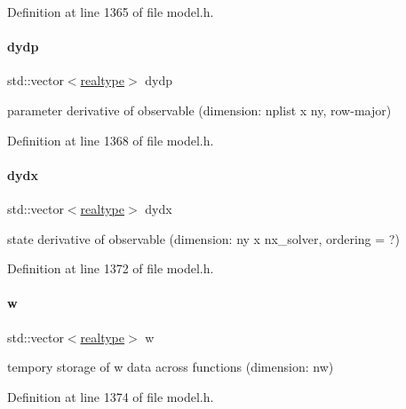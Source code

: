 Definition at line 1365 of file model.\+h.

\mbox{\label{classamici_1_1_model_a19a0e6ca8882314d7dd4e8f2fcc841fd}} 
\paragraph{\texorpdfstring{dydp}{dydp}}
{\footnotesize\ttfamily std\+::vector$<$\mbox{\hyperlink{namespaceamici_a1bdce28051d6a53868f7ccbf5f2c14a3}{realtype}}$>$ dydp\hspace{0.3cm}{\ttfamily [protected]}}

parameter derivative of observable (dimension\+: nplist x ny, row-\/major) 

Definition at line 1368 of file model.\+h.

\mbox{\label{classamici_1_1_model_ace5ccde1d7a065614717cd85fce09f9d}} 
\paragraph{\texorpdfstring{dydx}{dydx}}
{\footnotesize\ttfamily std\+::vector$<$\mbox{\hyperlink{namespaceamici_a1bdce28051d6a53868f7ccbf5f2c14a3}{realtype}}$>$ dydx\hspace{0.3cm}{\ttfamily [protected]}}

state derivative of observable (dimension\+: ny x nx\+\_\+solver, ordering = ?) 

Definition at line 1372 of file model.\+h.

\mbox{\label{classamici_1_1_model_a6b305431617db7966c726f756e819843}} 
\paragraph{\texorpdfstring{w}{w}}
{\footnotesize\ttfamily std\+::vector$<$\mbox{\hyperlink{namespaceamici_a1bdce28051d6a53868f7ccbf5f2c14a3}{realtype}}$>$ w\hspace{0.3cm}{\ttfamily [protected]}}

tempory storage of w data across functions (dimension\+: nw) 

Definition at line 1374 of file model.\+h.

